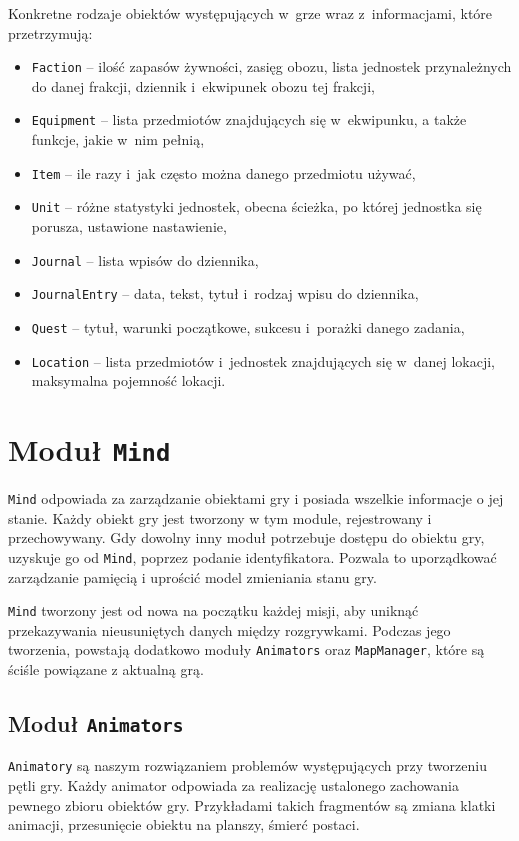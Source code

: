 \documentclass[licencjacka]{pracamgr}
\begin{document}
    Konkretne rodzaje obiektów występujących w~grze wraz z~informacjami, które przetrzymują:
    \begin{itemize}
      \item \texttt{Faction} -- ilość zapasów żywności, zasięg obozu, lista jednostek przynależnych do danej
      frakcji, dziennik i~ekwipunek obozu tej frakcji,
      \item \texttt{Equipment} -- lista przedmiotów znajdujących się w~ekwipunku, a także funkcje, jakie w~nim pełnią,
      \item \texttt{Item} --  ile razy i~jak często można danego przedmiotu używać,
      \item \texttt{Unit} -- różne statystyki jednostek, obecna ścieżka, po której jednostka się porusza, ustawione
      nastawienie,
      \item \texttt{Journal} -- lista wpisów do dziennika,
      \item \texttt{JournalEntry} -- data, tekst, tytuł i~rodzaj wpisu do dziennika,
      \item \texttt{Quest} -- tytuł, warunki początkowe, sukcesu i~porażki danego zadania,
      \item \texttt{Location} -- lista przedmiotów i~jednostek znajdujących się w~danej lokacji, maksymalna pojemność
      lokacji.
    \end{itemize}

  \section{Moduł \texttt{Mind}}

    \texttt{Mind} odpowiada za zarządzanie obiektami gry i posiada wszelkie informacje o jej stanie. 
    Każdy obiekt gry jest tworzony w tym module, rejestrowany i przechowywany. Gdy dowolny inny moduł potrzebuje dostępu do 
    obiektu gry, uzyskuje go od \texttt{Mind}, poprzez podanie identyfikatora. Pozwala to uporządkować zarządzanie pamięcią
    i uprościć model zmieniania stanu gry. 

    \texttt{Mind} tworzony jest od nowa na początku każdej misji, aby uniknąć przekazywania nieusuniętych danych między
    rozgrywkami. Podczas jego tworzenia, powstają dodatkowo moduły \texttt{Animators} oraz \texttt{MapManager}, które są
    ściśle powiązane z aktualną grą. 	
	
  \subsection{Moduł \texttt{Animators}}
    \texttt{Animatory} są naszym rozwiązaniem problemów występujących przy tworzeniu pętli gry. Każdy animator odpowiada
    za realizację ustalonego zachowania pewnego zbioru obiektów gry. Przykładami takich fragmentów są zmiana klatki
    animacji, przesunięcie obiektu na planszy, śmierć postaci.
    
\end{document}

